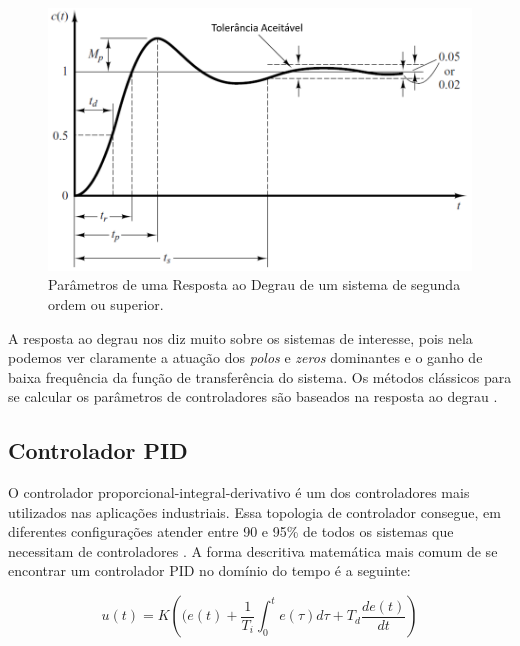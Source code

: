 \begin{figure}[H]
  \caption{Parâmetros de uma Resposta ao Degrau de um sistema de segunda ordem ou superior.}
  \begin{center}
      \includegraphics[scale=0.5]{referencial/img/transient_ogata_p170}
  \end{center}
  \label{fig:transient_ogata_p170}
\end{figure}

A resposta ao degrau nos diz muito sobre os sistemas de interesse, pois nela podemos ver claramente a atuação dos \textit{polos} e \textit{zeros} dominantes e o ganho de baixa frequência da função de transferência do sistema. Os métodos clássicos para se calcular os parâmetros de controladores são baseados na resposta ao degrau \cite{Ogata}. 



\subsection{Controlador PID}

O controlador proporcional-integral-derivativo é um dos controladores mais utilizados nas aplicações industriais. Essa topologia de controlador consegue, em diferentes configurações atender entre 90 e 95\% de todos os sistemas que necessitam de controladores \cite{Levine1996}. A forma descritiva matemática mais comum de se encontrar um controlador PID no domínio do tempo é a seguinte:

\begin{equation}\label{eq:PID}
  u(t) = K\left((e(t)+\frac{1}{T_i}\int_{0}^{t}{e(\tau)}d\tau+T_d\frac{de(t)}{dt}\right) 
\end{equation}

